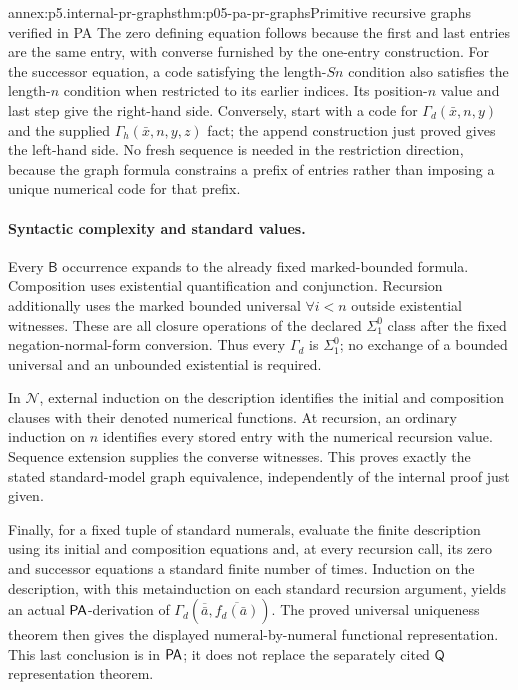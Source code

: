 \begin{annexitem}{annex:p5.internal-pr-graphs}{thm:p05-pa-pr-graphs}{Primitive recursive graphs verified in PA}
The zero defining equation follows because the first and last entries are
the same entry, with converse furnished by the one-entry construction.
For the successor equation, a code satisfying the length-\(Sn\) condition
also satisfies the length-\(n\) condition when restricted to its earlier
indices.  Its position-\(n\) value and last step give the right-hand side.
Conversely, start with a code for \(\Gamma_d(\bar x,n,y)\) and the
supplied \(\Gamma_h(\bar x,n,y,z)\) fact; the append construction just
proved gives the left-hand side.  No fresh sequence is needed in the
restriction direction, because the graph formula constrains a prefix of
entries rather than imposing a unique numerical code for that prefix.

\paragraph{Syntactic complexity and standard values.}
Every \(\mathsf B\) occurrence expands to the already fixed marked-bounded
formula.  Composition uses existential quantification and conjunction.
Recursion additionally uses the marked bounded universal \(\forall i<n\)
outside existential witnesses.  These are all closure operations of the
declared \(\Sigma^0_1\) class after the fixed negation-normal-form conversion.
Thus every \(\Gamma_d\) is \(\Sigma^0_1\); no exchange of a bounded
universal and an unbounded existential is required.

In \(\mathcal N\), external induction on the description identifies the
initial and composition clauses with their denoted numerical functions.
At recursion, an ordinary induction on \(n\) identifies every stored
entry with the numerical recursion value.  Sequence extension supplies the
converse witnesses.  This proves exactly the stated standard-model graph
equivalence, independently of the internal proof just given.

Finally, for a fixed tuple of standard numerals, evaluate the finite
description using its initial and composition equations and, at every
recursion call, its zero and successor equations a standard finite number
of times.  Induction on the description, with this metainduction on each
standard recursion argument, yields an actual \(\mathsf{PA}\)-derivation of
\(\Gamma_d(\overline{\bar a},\overline{f_d(\bar a)})\).
The proved universal uniqueness theorem then gives the displayed
numeral-by-numeral functional representation.  This last conclusion is in
\(\mathsf{PA}\); it does not replace the separately cited \(\mathsf Q\)
representation theorem.


\end{annexitem}
